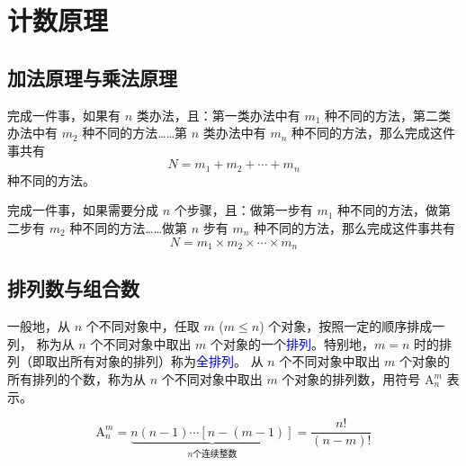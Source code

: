 \section{计数原理}
\subsection{加法原理与乘法原理}
\begin{theorem}[分类加法计数原理]
    完成一件事，如果有 $n$ 类办法，且：第一类办法中有 $m_1$ 种不同的方法，第二类办法中有 $m_2$ 种不同的方法……第 $n$ 类办法中有 $m_n$ 种不同的方法，那么完成这件事共有
    \[ N = m_1 + m_2 + \cdots + m_n \]
    种不同的方法。
\end{theorem}
\begin{theorem}
    完成一件事，如果需要分成 $n$ 个步骤，且：做第一步有 $m_1$ 种不同的方法，做第二步有 $m_2$ 种不同的方法……做第 $n$ 步有 $m_n$ 种不同的方法，那么完成这件事共有
\[ N = m_1 \times m_2 \times \cdots \times m_n \]
\end{theorem}
\clearpage
\subsection{排列数与组合数}
\begin{definition}
    一般地，从 \( n \) 个不同对象中，任取 \( m \) (\( m \leq n \)) 个对象，按照一定的顺序排成一列，
    称为从 \( n \) 个不同对象中取出 \( m \) 个对象的一个\textcolor{blue}{排列}。特别地，\( m = n \) 时的排列（即取出所有对象的排列）称为\textcolor{blue}{全排列}。
    从 \( n \) 个不同对象中取出 \( m \) 个对象的所有排列的个数，称为从 \( n \) 个不同对象中取出 \( m \) 个对象的排列数，用符号 \( \mathrm{A}_n^m \) 表示。
\end{definition}

\begin{theorem}
    \[\mathrm{A}_n^m=\underbrace{ n(n-1)\cdots[n-(m-1)]}_{n\text{个连续整数}}=\frac{n!}{(n-m)!}\]
\end{theorem}

